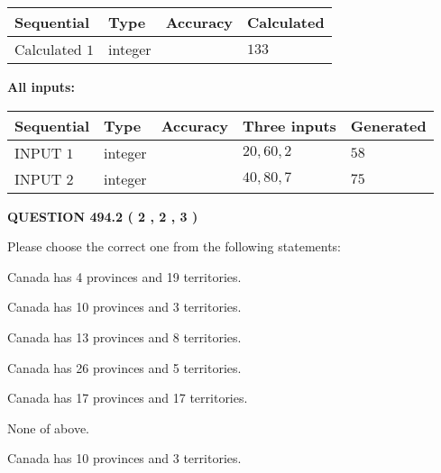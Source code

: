\documentclass[12pt]{article}
\begin{document}
   
  
  
\noindent\begin{tabular}{|l|l|l|l|}
\hline
 Sequential & Type & Accuracy & Calculated \\ 
\hline
 
 
  Calculated $  1 $ & integer &  & 
  $ 133 $ 
 \\  \hline  
 \end{tabular}
   
   
   
   
\noindent\vspace{0.1in}\hspace{-0.08in} {\textbf{\Large{All inputs: }}}
   
   
  
  
\noindent\begin{tabular}{|l|l|l|l|l|}
\hline
 Sequential & Type & Accuracy & Three inputs & Generated \\ 
\hline
 
 
  INPUT $  1 $ & integer &  & $
 20
 , 
 60
 , 
 2
 $ & $ 58 $ 
 \\  \hline  
 
 
  INPUT $  2 $ & integer &  & $
 40
 , 
 80
 , 
 7
 $ & $ 75 $ 
 \\  \hline  
 \end{tabular}
   
   
  
\vspace{0.2in}
  
{\textbf{\Large{QUESTION
494.2 
 ( 2 , 2 , 3 )
}}}
  
  
Please choose the correct one from the following statements:
 
 
Canada has   4 provinces and  19 territories.
 
 
Canada has 10  provinces and 3 territories.
 
 
Canada has  13 provinces and  8 territories.
 
 
Canada has  26 provinces and  5 territories.
 
 
Canada has  17 provinces and  17 territories.
 
 
 None of above.
 
 
\noindent{}
 
 
Canada has 10  provinces and 3 territories.
 
\end{document}
